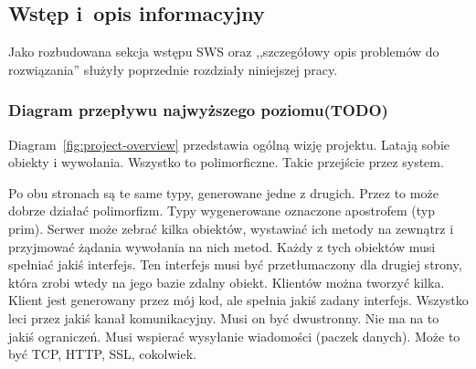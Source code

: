 \subsection{Wstęp i~opis informacyjny}
Jako rozbudowana sekcja wstępu SWS oraz ,,szczegółowy opis problemów do rozwiązania'' służyły poprzednie rozdziały niniejszej pracy.

\subsubsection{Diagram przepływu najwyższego poziomu(TODO)}
Diagram~\ref{fig:project-overview} przedstawia ogólną wizję projektu.
Latają sobie obiekty i wywołania. Wszystko to polimorficzne.
Takie przejście przez system.

Po obu stronach są te same typy, generowane jedne z drugich. Przez to może dobrze działać polimorfizm. Typy wygenerowane oznaczone apostrofem (typ prim).
Serwer może zebrać kilka obiektów, wystawiać ich metody na zewnątrz i przyjmować żądania wywołania na nich metod.
Każdy z tych obiektów musi spełniać jakiś interfejs. Ten interfejs musi być przetłumaczony dla drugiej strony, która zrobi wtedy na jego bazie zdalny obiekt.
Klientów można tworzyć kilka. Klient jest generowany przez mój kod, ale spełnia jakiś zadany interfejs.
Wszystko leci przez jakiś kanał komunikacyjny. Musi on być dwustronny. Nie ma na to jakiś ograniczeń. Musi wspierać wysyłanie wiadomości (paczek danych). Może to być TCP, HTTP, SSL, cokolwiek.

